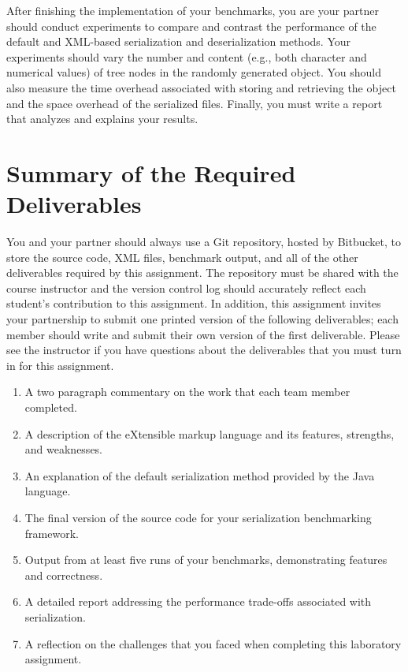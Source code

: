 After finishing the implementation of your benchmarks, you are your partner should conduct experiments to compare and
contrast the performance of the default and XML-based serialization and deserialization methods. Your experiments should
vary the number and content (e.g., both character and numerical values) of tree nodes in the randomly generated object.
You should also measure the time overhead associated with storing and retrieving the object and the space overhead
of the serialized files. Finally, you must write a report that analyzes and explains your results.

\section*{Summary of the Required Deliverables}

You and your partner should always use a Git repository, hosted by Bitbucket, to store the source code, XML files,
benchmark output, and all of the other deliverables required by this assignment. The repository must be shared with the
course instructor and the version control log should accurately reflect each student's contribution to this assignment. In
addition, this assignment invites your partnership to submit one printed version of the following deliverables; each
member should write and submit their own version of the first deliverable. Please see the instructor if you have
questions about the deliverables that you must turn in for this assignment.

\vspace*{-.05in}
\begin{enumerate}
  \setlength{\itemsep}{0pt}
  \item A two paragraph commentary on the work that each team member completed. 
  \item A description of the eXtensible markup language and its features, strengths, and weaknesses.
  \item An explanation of the default serialization method provided by the Java language.
  \item The final version of the source code for your serialization benchmarking framework.
  \item Output from at least five runs of your benchmarks, demonstrating features and correctness.
  \item A detailed report addressing the performance trade-offs associated with serialization.
  \item A reflection on the challenges that you faced when completing this laboratory assignment.
\end{enumerate}
\vspace*{-.05in}

